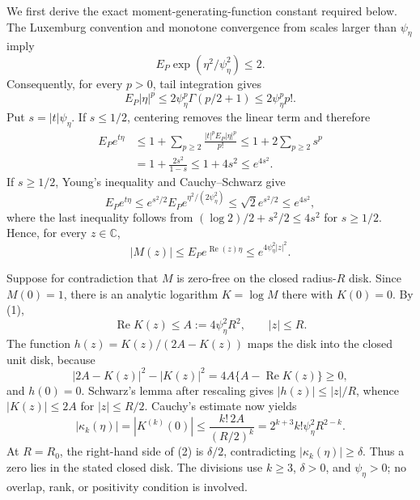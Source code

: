 We first derive the exact moment-generating-function constant required below.  The Luxemburg convention and monotone convergence from scales larger than \(\psi_{\eta}\) imply
\[
 E_P\exp(\eta^2/\psi_{\eta}^2)\le2.
\]
Consequently, for every \(p>0\), tail integration gives
\[
 E_P|\eta|^p
 \le2\psi_{\eta}^p\Gamma(p/2+1)
 \le2\psi_{\eta}^p p!.
\]
Put \(s=|t|\psi_{\eta}\).  If \(s\le1/2\), centering removes the linear term and therefore
\[
 \begin{aligned}
 E_Pe^{t\eta}
 &\le1+\sum_{p\ge2}\frac{|t|^pE_P|\eta|^p}{p!}
 \le1+2\sum_{p\ge2}s^p\\
 &=1+\frac{2s^2}{1-s}
 \le1+4s^2
 \le e^{4s^2}.
 \end{aligned}
\]
If \(s\ge1/2\), Young's inequality and Cauchy--Schwarz give
\[
 E_Pe^{t\eta}
 \le e^{s^2/2}E_Pe^{\eta^2/(2\psi_{\eta}^2)}
 \le\sqrt2e^{s^2/2}
 \le e^{4s^2},
\]
where the last inequality follows from \((\log2)/2+s^2/2\le4s^2\) for \(s\ge1/2\).  Hence, for every \(z\in\mathbb C\),
\[
 |M(z)|\le E_Pe^{\operatorname{Re}(z)\eta}
 \le e^{4\psi_{\eta}^2|z|^2}. \tag{1}
\]

Suppose for contradiction that \(M\) is zero-free on the closed radius-\(R\) disk.  Since \(M(0)=1\), there is an analytic logarithm \(K=\log M\) there with \(K(0)=0\).  By (1),
\[
 \operatorname{Re}K(z)\le A:=4\psi_{\eta}^2R^2,
 \qquad |z|\le R.
\]
The function \(h(z)=K(z)/(2A-K(z))\) maps the disk into the closed unit disk, because
\[
 |2A-K(z)|^2-|K(z)|^2=4A\{A-\operatorname{Re}K(z)\}\ge0,
\]
and \(h(0)=0\).  Schwarz's lemma after rescaling gives \(|h(z)|\le|z|/R\), whence \(|K(z)|\le2A\) for \(|z|\le R/2\).  Cauchy's estimate now yields
\[
 |\kappa_k(\eta)|=|K^{(k)}(0)|
 \le \frac{k!\,2A}{(R/2)^k}
 =2^{k+3}k!\psi_{\eta}^2R^{2-k}. \tag{2}
\]
At \(R=R_0\), the right-hand side of (2) is \(\delta/2\), contradicting \(|\kappa_k(\eta)|\ge\delta\).  Thus a zero lies in the stated closed disk.  The divisions use \(k\ge3\), \(\delta>0\), and \(\psi_{\eta}>0\); no overlap, rank, or positivity condition is involved.